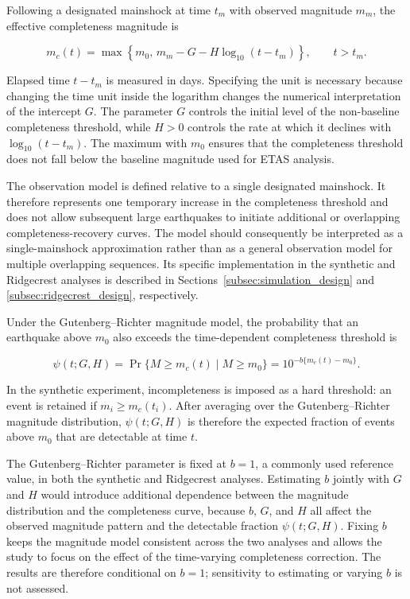\documentclass{statsmsc}
\begin{document}
Following a designated mainshock at time \(t_m\) with observed magnitude
\(m_m\), the effective completeness magnitude is

\begin{equation}
m_c(t)
=
\max\left\{
m_0,\,
m_m-G-H\log_{10}(t-t_m)
\right\},
\qquad t>t_m.
\label{eq:mct}
\end{equation}

Elapsed time \(t-t_m\) is measured in days. Specifying the unit is necessary
because changing the time unit inside the logarithm changes the numerical
interpretation of the intercept \(G\). The parameter \(G\) controls the
initial level of the non-baseline completeness threshold, while \(H>0\)
controls the rate at which it declines with \(\log_{10}(t-t_m)\). The maximum
with \(m_0\) ensures that the completeness threshold does not fall below the
baseline magnitude used for ETAS analysis.

The observation model is defined relative to a single designated mainshock.
It therefore represents one temporary increase in the completeness threshold
and does not allow subsequent large earthquakes to initiate additional or
overlapping completeness-recovery curves. The model should consequently be
interpreted as a single-mainshock approximation rather than as a general
observation model for multiple overlapping sequences. Its specific
implementation in the synthetic and Ridgecrest analyses is described in
Sections~\ref{subsec:simulation_design} and
\ref{subsec:ridgecrest_design}, respectively.

Under the Gutenberg--Richter magnitude model, the probability that an
earthquake above \(m_0\) also exceeds the time-dependent completeness
threshold is

\[
\psi(t;G,H)
=
\Pr\{M\geq m_c(t)\mid M\geq m_0\}
=
10^{-b\{m_c(t)-m_0\}}.
\]

In the synthetic experiment, incompleteness is imposed as a hard threshold:
an event is retained if \(m_i\geq m_c(t_i)\). After averaging over the
Gutenberg--Richter magnitude distribution, \(\psi(t;G,H)\) is therefore the
expected fraction of events above \(m_0\) that are detectable at time \(t\).

The Gutenberg--Richter parameter is fixed at \(b=1\), a commonly used
reference value, in both the synthetic and Ridgecrest analyses. Estimating
\(b\) jointly with \(G\) and \(H\) would introduce additional dependence
between the magnitude distribution and the completeness curve, because
\(b\), \(G\), and \(H\) all affect the observed magnitude pattern and the
detectable fraction \(\psi(t;G,H)\). Fixing \(b\) keeps the magnitude model
consistent across the two analyses and allows the study to focus on the
effect of the time-varying completeness correction. The results are therefore
conditional on \(b=1\); sensitivity to estimating or varying \(b\) is not
assessed.
\end{document}
